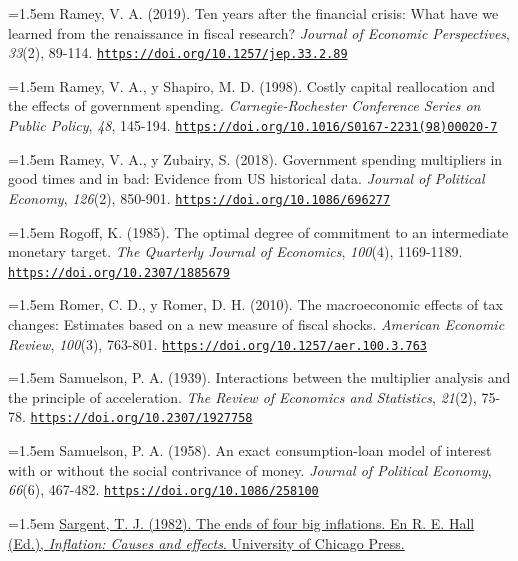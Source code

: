 \documentclass[10pt,a4paper]{article}
\begin{document}
\noindent\hangindent=1.5em Ramey, V. A. (2019). Ten years after the financial crisis: What have we learned from the renaissance in fiscal research? \textit{Journal of Economic Perspectives}, \textit{33}(2), 89-114. \href{https://doi.org/10.1257/jep.33.2.89}{\nolinkurl{https://doi.org/10.1257/jep.33.2.89}}

\noindent\hangindent=1.5em Ramey, V. A., y Shapiro, M. D. (1998). Costly capital reallocation and the effects of government spending. \textit{Carnegie-Rochester Conference Series on Public Policy}, \textit{48}, 145-194. \href{https://doi.org/10.1016/S0167-2231(98)00020-7}{\nolinkurl{https://doi.org/10.1016/S0167-2231(98)00020-7}}

\noindent\hangindent=1.5em Ramey, V. A., y Zubairy, S. (2018). Government spending multipliers in good times and in bad: Evidence from US historical data. \textit{Journal of Political Economy}, \textit{126}(2), 850-901. \href{https://doi.org/10.1086/696277}{\nolinkurl{https://doi.org/10.1086/696277}}

\noindent\hangindent=1.5em Rogoff, K. (1985). The optimal degree of commitment to an intermediate monetary target. \textit{The Quarterly Journal of Economics}, \textit{100}(4), 1169-1189. \href{https://doi.org/10.2307/1885679}{\nolinkurl{https://doi.org/10.2307/1885679}}

\noindent\hangindent=1.5em Romer, C. D., y Romer, D. H. (2010). The macroeconomic effects of tax changes: Estimates based on a new measure of fiscal shocks. \textit{American Economic Review}, \textit{100}(3), 763-801. \href{https://doi.org/10.1257/aer.100.3.763}{\nolinkurl{https://doi.org/10.1257/aer.100.3.763}}

\noindent\hangindent=1.5em Samuelson, P. A. (1939). Interactions between the multiplier analysis and the principle of acceleration. \textit{The Review of Economics and Statistics}, \textit{21}(2), 75-78. \href{https://doi.org/10.2307/1927758}{\nolinkurl{https://doi.org/10.2307/1927758}}

\noindent\hangindent=1.5em Samuelson, P. A. (1958). An exact consumption-loan model of interest with or without the social contrivance of money. \textit{Journal of Political Economy}, \textit{66}(6), 467-482. \href{https://doi.org/10.1086/258100}{\nolinkurl{https://doi.org/10.1086/258100}}

\noindent\hangindent=1.5em \href{https://www.nber.org/books-and-chapters/inflation-causes-and-effects/ends-four-big-inflations}{Sargent, T. J. (1982). The ends of four big inflations. En R. E. Hall (Ed.), \textit{Inflation: Causes and effects}. University of Chicago Press.}
\end{document}
